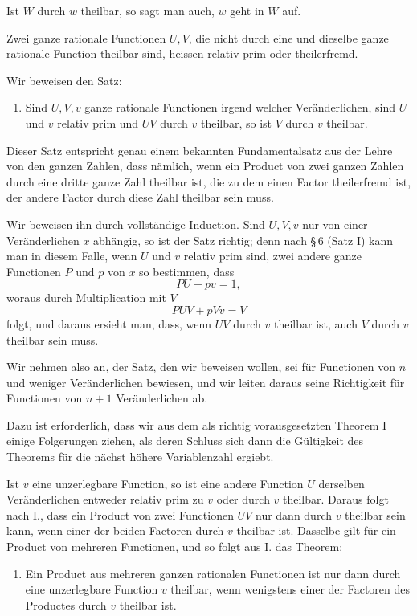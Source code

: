 \documentclass[11pt]{article}
\begin{document}
Ist $W$ durch $w$ theilbar, so sagt man auch, $w$ geht in $W$ auf.

Zwei ganze rationale Functionen $U,V$, die nicht durch eine und dieselbe ganze rationale Function theilbar sind, heissen relativ prim oder theilerfremd.

Wir beweisen den Satz:

\begin{enumerate}[label=\Roman*.,leftmargin=2.4em]
\item Sind $U,V,v$ ganze rationale Functionen irgend welcher Veränderlichen, sind $U$ und $v$ relativ prim und $UV$ durch $v$ theilbar, so ist $V$ durch $v$ theilbar.
\end{enumerate}

Dieser Satz entspricht genau einem bekannten Fundamentalsatz aus der Lehre von den ganzen Zahlen, dass nämlich, wenn ein Product von zwei ganzen Zahlen durch eine dritte ganze Zahl theilbar ist, die zu dem einen Factor theilerfremd ist, der andere Factor durch diese Zahl theilbar sein muss.

Wir beweisen ihn durch vollständige Induction. Sind $U,V,v$ nur von einer Veränderlichen $x$ abhängig, so ist der Satz richtig; denn nach \S\,6 (Satz I) kann man in diesem Falle, wenn $U$ und $v$ relativ prim sind, zwei andere ganze Functionen $P$ und $p$ von $x$ so bestimmen, dass
\[
PU+pv=1,
\]
woraus durch Multiplication mit $V$
\[
PUV+pVv=V
\]
folgt, und daraus ersieht man, dass, wenn $UV$ durch $v$ theilbar ist, auch $V$ durch $v$ theilbar sein muss.

Wir nehmen also an, der Satz, den wir beweisen wollen, sei für Functionen von $n$ und weniger Veränderlichen bewiesen, und wir leiten daraus seine Richtigkeit für Functionen von $n+1$ Veränderlichen ab.

Dazu ist erforderlich, dass wir aus dem als richtig vorausgesetzten Theorem I einige Folgerungen ziehen, als deren Schluss sich dann die Gültigkeit des Theorems für die nächst höhere Variablenzahl ergiebt.

Ist $v$ eine unzerlegbare Function, so ist eine andere Function $U$ derselben Veränderlichen entweder relativ prim zu $v$ oder durch $v$ theilbar. Daraus folgt nach I., dass ein Product von zwei Functionen $UV$ nur dann durch $v$ theilbar sein kann, wenn einer der beiden Factoren durch $v$ theilbar ist. Dasselbe gilt für ein Product von mehreren Functionen, und so folgt aus I. das Theorem:

\begin{enumerate}[label=\Roman*.,leftmargin=2.4em,start=2]
\item Ein Product aus mehreren ganzen rationalen Functionen ist nur dann durch eine unzerlegbare Function $v$ theilbar, wenn wenigstens einer der Factoren des Productes durch $v$ theilbar ist.
\end{enumerate}
\end{document}
